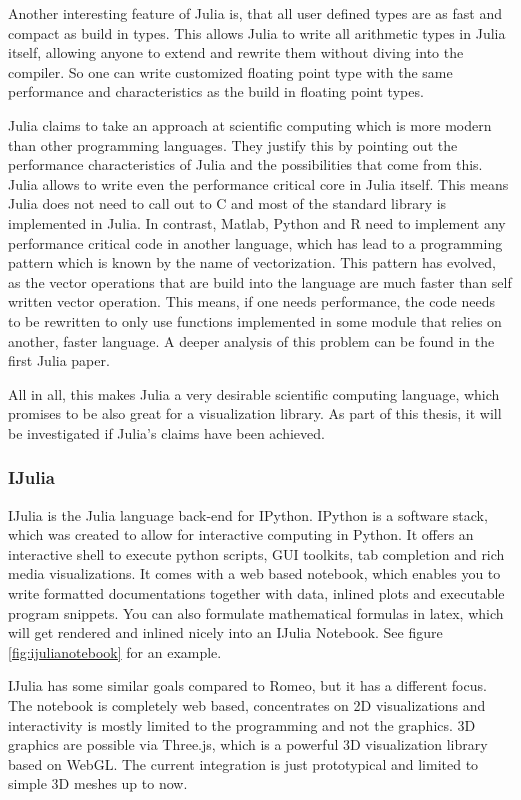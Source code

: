 Another interesting feature of Julia is, that all user defined types are as fast and compact as build in types.
This allows Julia to write all arithmetic types in Julia itself, allowing anyone to extend and rewrite them without diving into the compiler. 
So one can write customized floating point type with the same performance and characteristics as the build in floating point types.

Julia claims to take an approach at scientific computing which is more modern than other programming languages.
They justify this by pointing out the performance characteristics of Julia and the possibilities that come from this. 
Julia allows to write even the performance critical core in Julia itself. This means Julia does not need to call out to C and most of the standard library is implemented in Julia. 
In contrast, Matlab, Python and R need to implement any performance critical code in another language, which has lead to a programming pattern which is known by the name of vectorization. This pattern has evolved, as the vector operations that are build into the language are much faster than self written vector operation.
This means, if one needs performance, the code needs to be rewritten to only use functions implemented in some module that relies on another, faster language.
A deeper analysis of this problem can be found in the first Julia paper\cite{2012arXiv1209.5145B}.

All in all, this makes Julia a very desirable scientific computing language, which promises to be also great for a visualization library.
As part of this thesis, it will be investigated if Julia's claims have been achieved.



\subsubsection{IJulia}
IJulia is the Julia language back-end for IPython.
IPython is a software stack, which was created to allow for interactive computing in Python.
It offers an interactive shell to execute python scripts, \ac{GUI} toolkits, tab completion and rich media visualizations.
It comes with a web based notebook, which enables you to write formatted documentations together with data, inlined plots and executable program snippets. You can also formulate mathematical formulas in latex, which will get rendered and inlined nicely into an IJulia Notebook.
See figure \ref{fig:ijulianotebook} for an example.

IJulia has some similar goals compared to Romeo, but it has a different focus.
The notebook is completely web based, concentrates on 2D visualizations and interactivity is mostly limited to the programming and not the graphics.
3D graphics are possible via Three.js, which is a powerful 3D visualization library based on WebGL.
The current integration is just prototypical and limited to simple 3D meshes up to now.


